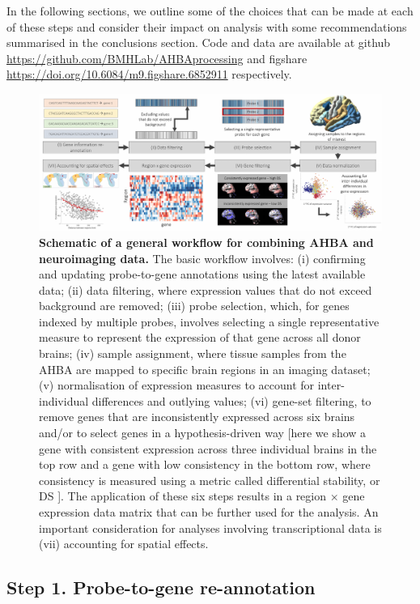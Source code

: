 In the following sections, we outline some of the choices that can be made at each of these steps and consider their impact on analysis with some recommendations summarised in the conclusions section. Code and data are available at github \url{https://github.com/BMHLab/AHBAprocessing} and figshare \url{https://doi.org/10.6084/m9.figshare.6852911} respectively.

\begin{figure}[h!]
  \centering
    \includegraphics[width=1\textwidth]{Chapter4/Ch4Fig2.pdf}
\caption{\textbf{Schematic of a general workflow for combining AHBA and neuroimaging data.} The basic workflow involves: (i) confirming and updating probe-to-gene annotations using the latest available data; (ii) data filtering, where expression values that do not exceed background are removed; (iii) probe selection, which, for genes indexed by multiple probes, involves selecting a single representative measure to represent the expression of that gene across all donor brains; (iv) sample assignment, where tissue samples from the AHBA are mapped to specific brain regions in an imaging dataset; (v) normalisation of expression measures to account for inter-individual differences and outlying values; (vi) gene-set filtering, to remove genes that are inconsistently expressed across six brains and/or to select genes in a hypothesis-driven way [here we show a gene with consistent expression across three individual brains in the top row and a gene with low consistency in the bottom row, where consistency is measured using a metric called differential stability, or DS \citep{Hawrylycz2015}]. The application of these six steps results in a region $\times$ gene expression data matrix that can be further used for the analysis. An important consideration for analyses involving transcriptional data is (vii) accounting for spatial effects.}

\label{fig:Ch4Fig2}
\end{figure}

\subsection{Step 1. Probe-to-gene re-annotation}

